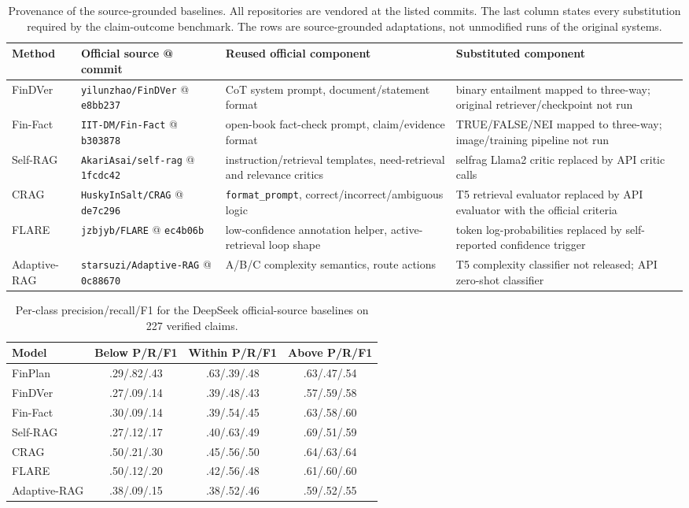 \documentclass[11pt]{article}
\newcommand{\method}{FinPlan}
\begin{document}
\begin{table}[t]
\centering
\scriptsize
\setlength{\tabcolsep}{3pt}
\begin{tabular}{p{1.5cm}p{3.8cm}p{4.7cm}p{4.7cm}}
\toprule
Method & Official source @ commit & Reused official component & Substituted component \\
\midrule
FinDVer & \texttt{yilunzhao/FinDVer} @ \texttt{e8bb237} & CoT system prompt, document/statement format & binary entailment mapped to three-way; original retriever/checkpoint not run \\
Fin-Fact & \texttt{IIT-DM/Fin-Fact} @ \texttt{b303878} & open-book fact-check prompt, claim/evidence format & TRUE/FALSE/NEI mapped to three-way; image/training pipeline not run \\
Self-RAG & \texttt{AkariAsai/self-rag} @ \texttt{1fcdc42} & instruction/retrieval templates, need-retrieval and relevance critics & selfrag Llama2 critic replaced by API critic calls \\
CRAG & \texttt{HuskyInSalt/CRAG} @ \texttt{de7c296} & \texttt{format\_prompt}, correct/incorrect/ambiguous logic & T5 retrieval evaluator replaced by API evaluator with the official criteria \\
FLARE & \texttt{jzbjyb/FLARE} @ \texttt{ec4b06b} & low-confidence annotation helper, active-retrieval loop shape & token log-probabilities replaced by self-reported confidence trigger \\
Adaptive-RAG & \texttt{starsuzi/Adaptive-RAG} @ \texttt{0c88670} & A/B/C complexity semantics, route actions & T5 complexity classifier not released; API zero-shot classifier \\
\bottomrule
\end{tabular}
\caption{Provenance of the source-grounded baselines. All repositories are vendored at the listed commits. The last column states every substitution required by the claim-outcome benchmark. The rows are source-grounded adaptations, not unmodified runs of the original systems.}
\label{tab:provenance}
\end{table}

\begin{table}[t]
\centering
\scriptsize
\setlength{\tabcolsep}{2pt}
\begin{tabular}{lccc}
\toprule
Model & Below P/R/F1 & Within P/R/F1 & Above P/R/F1 \\
\midrule
\method{} & .29/.82/.43 & .63/.39/.48 & .63/.47/.54 \\
FinDVer & .27/.09/.14 & .39/.48/.43 & .57/.59/.58 \\
Fin-Fact & .30/.09/.14 & .39/.54/.45 & .63/.58/.60 \\
Self-RAG & .27/.12/.17 & .40/.63/.49 & .69/.51/.59 \\
CRAG & .50/.21/.30 & .45/.56/.50 & .64/.63/.64 \\
FLARE & .50/.12/.20 & .42/.56/.48 & .61/.60/.60 \\
Adaptive-RAG & .38/.09/.15 & .38/.52/.46 & .59/.52/.55 \\
\bottomrule
\end{tabular}
\caption{Per-class precision/recall/F1 for the DeepSeek official-source baselines on 227 verified claims.}
\label{tab:per-class}
\end{table}
\end{document}
